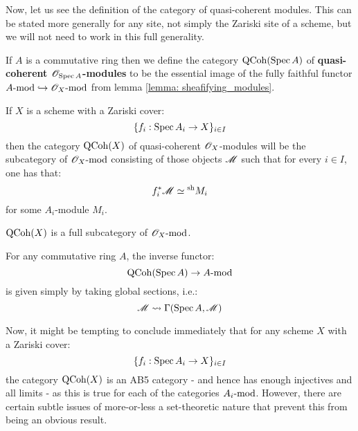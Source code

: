             Now, let us see the definition of the category of quasi-coherent modules. This can be stated more generally for any site, not simply the Zariski site of a scheme, but we will not need to work in this full generality.
            \begin{definition} \label{def: quasi_coherent_modules}
                If $A$ is a commutative ring then we define the category $\QCoh(\Spec A)$ of \textbf{quasi-coherent $\scrO_{\Spec A}$-modules} to be the essential image of the fully faithful functor $A\mod \hookrightarrow \scrO_X\mod$ from lemma \ref{lemma: sheafifying_modules}.

                If $X$ is a scheme with a Zariski cover:
                    $$\{ f_i: \Spec A_i \to X \}_{i \in I}$$
                then the category $\QCoh(X)$ of quasi-coherent $\scrO_X$-modules will be the subcategory of $\scrO_X\mod$ consisting of those objects $\scrM$ such that for every $i \in I$, one has that:
                    $$f_i^*\scrM \cong {}^{\sh}M_i$$
                for some $A_i$-module $M_i$.
            \end{definition}
            \begin{remark}
                $\QCoh(X)$ is a full subcategory of $\scrO_X\mod$.
            \end{remark}
            \begin{remark}
                For any commutative ring $A$, the inverse functor:
                    $$\QCoh(\Spec A) \to A\mod$$
                is given simply by taking global sections, i.e.:
                    $$\scrM \mapsto \Gamma(\Spec A, \scrM)$$
            \end{remark}

            Now, it might be tempting to conclude immediately that for any scheme $X$ with a Zariski cover:
                $$\{f_i: \Spec A_i \to X\}_{i \in I}$$
            the category $\QCoh(X)$ is an AB5 category - and hence has enough injectives and all limits - as this is true for each of the categories $A_i\mod$. However, there are certain subtle issues of more-or-less a set-theoretic nature that prevent this from being an obvious result.

